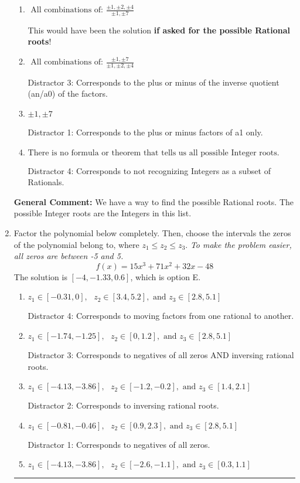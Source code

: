 \documentclass{extbook}[14pt]
\newcommand{\litem}[1]{\item #1

\rule{\textwidth}{0.4pt}}
\begin{document}
\begin{enumerate}
{\begin{enumerate}[label=\Alph*.]
* This is the solution \textbf{since we asked for the possible Integer roots}!
\item \( \text{ All combinations of: }\frac{\pm 1,\pm 2,\pm 4}{\pm 1,\pm 7} \)

This would have been the solution \textbf{if asked for the possible Rational roots}!
\item \( \text{ All combinations of: }\frac{\pm 1,\pm 7}{\pm 1,\pm 2,\pm 4} \)

 Distractor 3: Corresponds to the plus or minus of the inverse quotient (an/a0) of the factors. 
\item \( \pm 1,\pm 7 \)

 Distractor 1: Corresponds to the plus or minus factors of a1 only.
\item \( \text{There is no formula or theorem that tells us all possible Integer roots.} \)

 Distractor 4: Corresponds to not recognizing Integers as a subset of Rationals.
\end{enumerate}

\textbf{General Comment:} We have a way to find the possible Rational roots. The possible Integer roots are the Integers in this list.
}
\litem{
Factor the polynomial below completely. Then, choose the intervals the zeros of the polynomial belong to, where $z_1 \leq z_2 \leq z_3$. \textit{To make the problem easier, all zeros are between -5 and 5.}
\[ f(x) = 15x^{3} +71 x^{2} +32 x -48 \]The solution is \( [-4, -1.33, 0.6] \), which is option E.\begin{enumerate}[label=\Alph*.]
\item \( z_1 \in [-0.31, 0], \text{   }  z_2 \in [3.4, 5.2], \text{   and   } z_3 \in [2.8, 5.1] \)

 Distractor 4: Corresponds to moving factors from one rational to another.
\item \( z_1 \in [-1.74, -1.25], \text{   }  z_2 \in [0, 1.2], \text{   and   } z_3 \in [2.8, 5.1] \)

 Distractor 3: Corresponds to negatives of all zeros AND inversing rational roots.
\item \( z_1 \in [-4.13, -3.86], \text{   }  z_2 \in [-1.2, -0.2], \text{   and   } z_3 \in [1.4, 2.1] \)

 Distractor 2: Corresponds to inversing rational roots.
\item \( z_1 \in [-0.81, -0.46], \text{   }  z_2 \in [0.9, 2.3], \text{   and   } z_3 \in [2.8, 5.1] \)

 Distractor 1: Corresponds to negatives of all zeros.
\item \( z_1 \in [-4.13, -3.86], \text{   }  z_2 \in [-2.6, -1.1], \text{   and   } z_3 \in [0.3, 1.1] \)


\end{enumerate}}
\end{enumerate}
\end{document}
